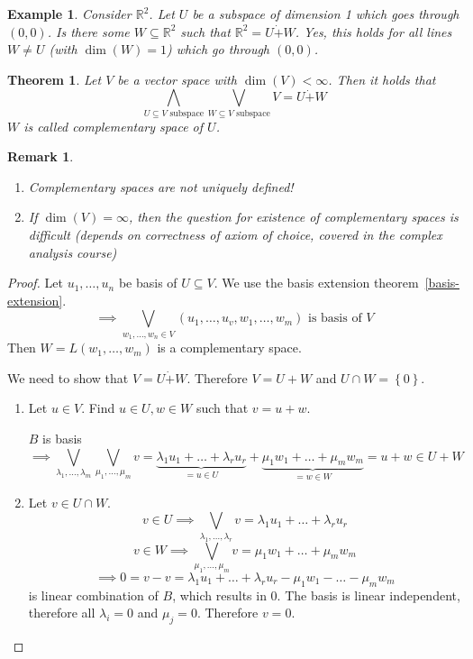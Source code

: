 \documentclass[a4paper,landscape,twocolumn]{article}
\newcommand\set[1]{\left\{#1\right\}}
\newtheorem{theorem}{Theorem}[section]
\newtheorem{ex}{Example}[section]
\newtheorem{rem}{Remark}[section]
\begin{document}
\begin{ex}
  Consider $\mathbb R^2$. Let $U$ be a subspace of dimension 1 which goes through $(0, 0)$.
  Is there some $W \subseteq \mathbb R^2$ such that $\mathbb R^2 = U \dot{+} W$.
  Yes, this holds for all lines $W \neq U$ (with $\dim(W) = 1$) which go through $(0, 0)$.
\end{ex}

\begin{theorem}
  \label{satz-4-10}
  Let $V$ be a vector space with $\dim(V) < \infty$. Then it holds that
  \[ \bigwedge_{U \subseteq V \text{ subspace}} \bigvee_{W \subseteq V \text{ subspace}} V = U \dot{+} W \]
  $W$ is called \emph{complementary space of $U$}.
\end{theorem}

\begin{rem}
  \begin{enumerate}
    \item Complementary spaces are not uniquely defined!
    \item If $\dim(V) = \infty$, then the question for existence of complementary spaces is difficult
      (depends on correctness of axiom of choice, covered in the complex analysis course)
  \end{enumerate}
\end{rem}

\begin{proof}
  Let $u_1, \dots, u_n$ be basis of $U \subseteq V$.
  We use the basis extension theorem~\ref{basis-extension}.
  \[ \implies \bigvee_{w_1, \dots, w_n \in V} (u_1, \dots, u_v, w_1, \dots, w_m) \text{ is basis of } V \]
  Then $W = L(w_1, \dots, w_m)$ is a complementary space.

  We need to show that $V = U \dot{+} W$.
  Therefore $V = U + W$ and $U \cap W = \set{0}$.

  \begin{enumerate}
    \item
      Let $u \in V$. Find $u \in U, w \in W$ such that $v = u + w$.

      $B$ is basis
      \[
        \implies \bigvee_{\lambda_1, \dots, \lambda_m} \bigvee_{\mu_1, \dots, \mu_m} v
        = \underbrace{\lambda_1 u_1 + \dots + \lambda_r u_r}_{= u \in U} + \underbrace{\mu_1 w_1 + \dots + \mu_m w_m}_{= w \in W}
        = u + w \in U + W
      \]
    \item
      Let $v \in U \cap W$.
      \[ v \in U \implies \bigvee_{\lambda_1, \dots, \lambda_r} v = \lambda_1 u_1 + \dots + \lambda_r u_r \]
      \[ v \in W \implies \bigvee_{\mu_1, \dots, \mu_m} v = \mu_1 w_1 + \dots + \mu_m w_m \]
      \[ \implies 0 = v - v = \lambda_1 u_1 + \dots + \lambda_r u_r - \mu_1 w_1 - \dots - \mu_m w_m \]
      is linear combination of $B$, which results in $0$. The basis is linear independent,
      therefore all $\lambda_i = 0$ and $\mu_j = 0$. Therefore $v = 0$.
  \end{enumerate}
\end{proof}
\end{document}
